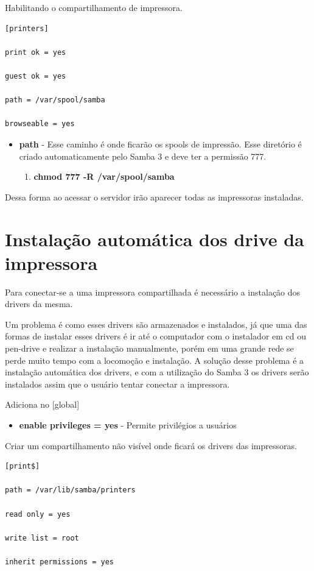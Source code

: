 Habilitando o compartilhamento de impressora.\\

\begin{lstlisting}	
[printers]

print ok = yes

guest ok = yes

path = /var/spool/samba

browseable = yes	
\end{lstlisting}

\begin{itemize}
	\item \textbf{path} - Esse caminho é onde ficarão os spools de impressão. Esse diretório é criado automaticamente pelo Samba 3 e deve ter a permissão 777.
	\begin{enumerate}
		\item \textbf{chmod 777 -R /var/spool/samba}
	\end{enumerate}
\end{itemize}

Dessa forma ao acessar o servidor irão aparecer todas as impressoras instaladas.

\section{Instalação automática dos drive da impressora}

Para conectar-se a uma impressora compartilhada é necessário a instalação dos drivers da mesma. 

Um problema é como esses drivers são armazenados e instalados, já que uma das formas de instalar esses drivers é ir até o computador com o instalador em cd ou pen-drive e realizar a instalação manualmente, porém em uma grande rede se perde muito tempo com a locomoção e instalação. A solução desse problema é a instalação automática dos drivers, e com a utilização do Samba 3 os drivers serão instalados assim que o usuário tentar conectar a impressora.

Adiciona no [global]

\begin{itemize}
	\item \textbf{enable privileges = yes} - Permite privilégios a usuários
\end{itemize}

Criar um compartilhamento não visível onde ficará os drivers das impressoras.\\

\begin{lstlisting}	
[print$]

path = /var/lib/samba/printers

read only = yes

write list = root

inherit permissions = yes	
\end{lstlisting}

